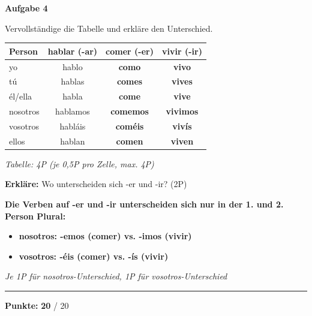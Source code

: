 \documentclass[11pt, a4paper]{article}
\newcommand{\fachfarbe}{spanisch}
\newcommand{\maxpunkte}{20}
\newcommand{\punktebox}[1]{\hfill\fbox{\small \_/#1}}
\newcommand{\lsg}[1]{\textcolor{loesung}{\textbf{#1}}}
\newenvironment{aufgabe}[1]{%
    \vspace{10pt}
    \noindent\textbf{\textcolor{\fachfarbe}{Aufgabe #1}}
    \vspace{5pt}
    \begin{list}{}{\leftmargin=0pt}
    \item[]
}{%
    \end{list}
}
\begin{document}

\begin{aufgabe}{4}
Vervollständige die Tabelle und erkläre den Unterschied. \punktebox{6}
\end{aufgabe}

\begin{center}
\begin{tabular}{|l|c|c|c|}
\hline
\textbf{Person} & \textbf{hablar} (-ar) & \textbf{comer} (-er) & \textbf{vivir} (-ir) \\
\hline
yo & hablo & \lsg{como} & \lsg{vivo} \\
\hline
tú & hablas & \lsg{comes} & \lsg{vives} \\
\hline
él/ella & habla & \lsg{come} & \lsg{vive} \\
\hline
nosotros & hablamos & \lsg{comemos} & \lsg{vivimos} \\
\hline
vosotros & habláis & \lsg{coméis} & \lsg{vivís} \\
\hline
ellos & hablan & \lsg{comen} & \lsg{viven} \\
\hline
\end{tabular}
\end{center}

\textit{\textcolor{grau}{Tabelle: 4P (je 0,5P pro Zelle, max. 4P)}}

\vspace{1em}

\textbf{Erkläre:} Wo unterscheiden sich -er und -ir? (2P)

\lsg{Die Verben auf -er und -ir unterscheiden sich nur in der 1. und 2. Person Plural:}
\begin{itemize}
    \item \lsg{nosotros: -emos (comer) vs. -imos (vivir)}
    \item \lsg{vosotros: -éis (comer) vs. -ís (vivir)}
\end{itemize}

\textit{\textcolor{grau}{Je 1P für nosotros-Unterschied, 1P für vosotros-Unterschied}}

\vspace{20pt}
\hrule
\vspace{10pt}

\begin{flushright}
\textbf{Punkte:} \lsg{\maxpunkte} / \maxpunkte
\end{flushright}
\end{document}
